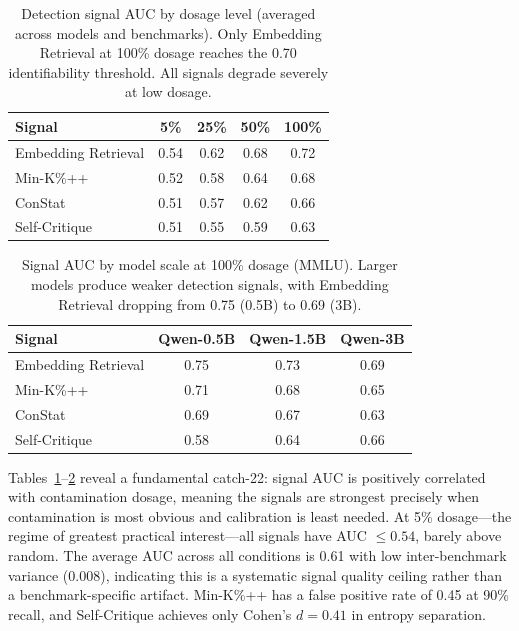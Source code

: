 \documentclass[letterpaper, 10pt, twocolumn]{article}
\begin{document}
\begin{table}[t]
\centering
\caption{Detection signal AUC by dosage level (averaged across models and benchmarks). Only Embedding Retrieval at 100\% dosage reaches the 0.70 identifiability threshold. All signals degrade severely at low dosage.}
\label{tab:signal_auc_dosage}
\small
\begin{tabular}{lcccc}
\toprule
Signal & 5\% & 25\% & 50\% & 100\% \\
\midrule
Embedding Retrieval & 0.54 & 0.62 & 0.68 & 0.72 \\
Min-K\%++ & 0.52 & 0.58 & 0.64 & 0.68 \\
ConStat & 0.51 & 0.57 & 0.62 & 0.66 \\
Self-Critique & 0.51 & 0.55 & 0.59 & 0.63 \\
\bottomrule
\end{tabular}
\end{table}

\begin{table}[t]
\centering
\caption{Signal AUC by model scale at 100\% dosage (MMLU). Larger models produce weaker detection signals, with Embedding Retrieval dropping from 0.75 (0.5B) to 0.69 (3B).}
\label{tab:signal_auc_scale}
\small
\begin{tabular}{lccc}
\toprule
Signal & Qwen-0.5B & Qwen-1.5B & Qwen-3B \\
\midrule
Embedding Retrieval & 0.75 & 0.73 & 0.69 \\
Min-K\%++ & 0.71 & 0.68 & 0.65 \\
ConStat & 0.69 & 0.67 & 0.63 \\
Self-Critique & 0.58 & 0.64 & 0.66 \\
\bottomrule
\end{tabular}
\end{table}

Tables~\ref{tab:signal_auc_dosage}--\ref{tab:signal_auc_scale} reveal a fundamental catch-22: signal AUC is positively correlated with contamination dosage, meaning the signals are strongest precisely when contamination is most obvious and calibration is least needed.
At 5\% dosage---the regime of greatest practical interest---all signals have AUC $\leq 0.54$, barely above random.
The average AUC across all conditions is 0.61 with low inter-benchmark variance (0.008), indicating this is a systematic signal quality ceiling rather than a benchmark-specific artifact.
Min-K\%++ has a false positive rate of 0.45 at 90\% recall, and Self-Critique achieves only Cohen's $d = 0.41$ in entropy separation.
\end{document}
